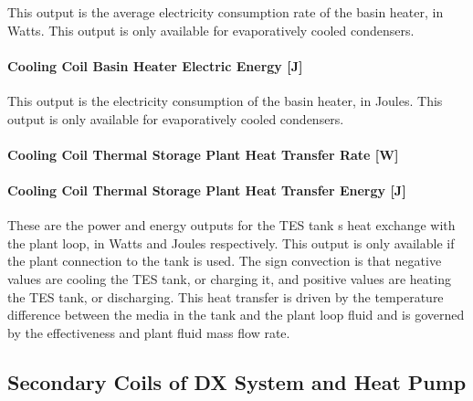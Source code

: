 This output is the average electricity consumption rate of the basin heater, in Watts. This output is only available for evaporatively cooled condensers.

\paragraph{Cooling Coil Basin Heater Electric Energy {[}J{]}}\label{cooling-coil-basin-heater-electric-energy-j-2}

This output is the electricity consumption of the basin heater, in Joules. This output is only available for evaporatively cooled condensers.

\paragraph{Cooling Coil Thermal Storage Plant Heat Transfer Rate {[}W{]}}\label{cooling-coil-thermal-storage-plant-heat-transfer-rate-w}

\paragraph{Cooling Coil Thermal Storage Plant Heat Transfer Energy {[}J{]}}\label{cooling-coil-thermal-storage-plant-heat-transfer-energy-j}

These are the power and energy outputs for the TES tank s heat exchange with the plant loop, in Watts and Joules respectively. This output is only available if the plant connection to the tank is used. The sign convection is that negative values are cooling the TES tank, or charging it, and positive values are heating the TES tank, or discharging. This heat transfer is driven by the temperature difference between the media in the tank and the plant loop fluid and is governed by the effectiveness and plant fluid mass flow rate.

\subsection{Secondary Coils of DX System and Heat Pump}\label{secondary-coils-of-dx-system-and-heat-pump}

